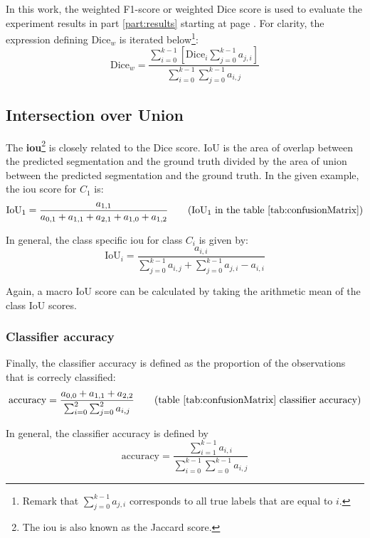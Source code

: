 In this work, the weighted F1-score or weighted Dice score is used to evaluate the experiment results in part \ref{part:results} starting at page \pageref{part:results}.
For clarity, the expression defining $\text{Dice}_w$ is iterated below\footnote{Remark that $\sum_{j=0}^{k-1} a_{j,i}$ corresponds to all true labels that are equal to $i$.}:
\begin{equation}
    \text{Dice}_w = \frac{\sum_{i=0}^{k-1} \left[ \text{Dice}_i \sum_{j=0}^{k-1} a_{j,i} \right] }{\sum_{i=0}^{k-1} \sum_{j=0}^{k-1} a_{i,j} } \label{eq:weighted_dice}
\end{equation}

\subsection{Intersection over Union}

The \textbf{\acrfull{iou}}\footnote{The \acrshort{iou} is also known as the Jaccard score.} is closely related to the Dice score.
IoU is the area of overlap between the predicted segmentation and the ground truth divided by the area of union between the predicted segmentation and the ground truth.
In the given example, the \acrshort{iou} score for $C_1$ is:
\begin{equation}
    \text{IoU}_1 = \frac{a_{1,1}}{a_{0,1}+a_{1,1}+a_{2,1}+a_{1,0}+a_{1,2}} \tag{IoU$_1$ in the table \ref{tab:confusionMatrix}}
\end{equation}

In general, the class specific \acrfull{iou} for class $C_i$ is given by:
\begin{equation}
    \text{IoU}_i = \frac{a_{i,i}}{\sum_{j=0}^{k-1} a_{i, j} + \sum_{j=0}^{k-1} a_{j,i} - a_{i,i}} 
\end{equation}

Again, a macro IoU score can be calculated by taking the arithmetic mean of the class IoU scores.

\subsubsection{Classifier accuracy}

Finally, the classifier accuracy is defined as the proportion of the observations that is correcly classified:
\begin{equation}
    \text{accuracy} = \frac{a_{0,0} + a_{1,1} + a_{2,2}}{\sum_{i=0}^{2} \sum_{j=0}^{2} a_{i,j}   } \tag{table \ref{tab:confusionMatrix} classifier accuracy}
\end{equation}

In general, the classifier accuracy is defined by 
\begin{equation}
    \text{accuracy} = \frac{\sum_{i=1}^{k-1}a_{i,i}}{\sum_{i=0}^{k-1} \sum_{=0}^{k-1} a_{i,j}   } 
\end{equation}



